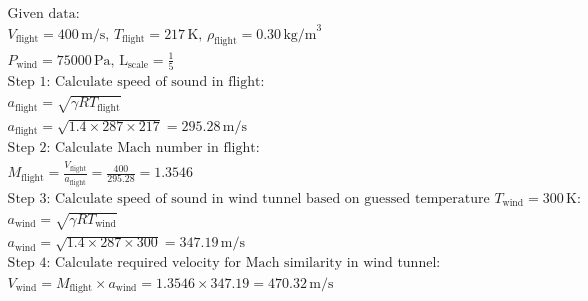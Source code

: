 \begin{homeworkProblem}
	\begin{align*}
		\text{Given data:}                                                                                                                                                 \\
		V_{\text{flight}} = 400 \, \text{m/s}, \, T_{\text{flight}} = 217 \, \text{K}, \, \rho_{\text{flight}} = 0.30 \, \text{kg/m}^3                                     \\
		P_{\text{wind}} = 75000 \, \text{Pa}, \, \text{L}_{\text{scale}} = \frac{1}{5}                                                                                     \\

		\text{Step 1: Calculate speed of sound in flight:}                                                                                                                 \\
		a_{\text{flight}} = \sqrt{\gamma R T_{\text{flight}}}                                                                                                              \\
		a_{\text{flight}} = \sqrt{1.4 \times 287 \times 217} = 295.28 \, \text{m/s}                                                                                        \\

		\text{Step 2: Calculate Mach number in flight:}                                                                                                                    \\
		M_{\text{flight}} = \frac{V_{\text{flight}}}{a_{\text{flight}}} = \frac{400}{295.28} = 1.3546                                                                      \\

		\text{Step 3: Calculate speed of sound in wind tunnel based on guessed temperature } T_{\text{wind}} = 300 \, \text{K}:                                            \\
		a_{\text{wind}} = \sqrt{\gamma R T_{\text{wind}}}                                                                                                                  \\
		a_{\text{wind}} = \sqrt{1.4 \times 287 \times 300} = 347.19 \, \text{m/s}                                                                                          \\

		\text{Step 4: Calculate required velocity for Mach similarity in wind tunnel:}                                                                                     \\
		V_{\text{wind}} = M_{\text{flight}} \times a_{\text{wind}} = 1.3546 \times 347.19 = 470.32 \, \text{m/s}                                                           \\


\end{align*}
\end{homeworkProblem}
